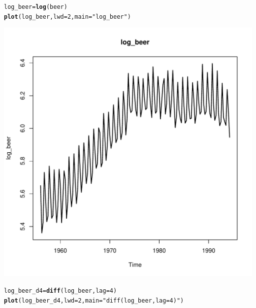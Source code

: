 \documentclass[10pt]{article}\usepackage[]{graphicx}\usepackage[]{color}
\makeatletter
\def\maxwidth{ %
  \ifdim\Gin@nat@width>\linewidth
    \linewidth
  \else
    \Gin@nat@width
  \fi
}
\newcommand{\hlnum}[1]{\textcolor[rgb]{0.686,0.059,0.569}{#1}}%
\newcommand{\hlstr}[1]{\textcolor[rgb]{0.192,0.494,0.8}{#1}}%
\newcommand{\hlstd}[1]{\textcolor[rgb]{0.345,0.345,0.345}{#1}}%
\newcommand{\hlkwb}[1]{\textcolor[rgb]{0.69,0.353,0.396}{#1}}%
\newcommand{\hlkwc}[1]{\textcolor[rgb]{0.333,0.667,0.333}{#1}}%
\newcommand{\hlkwd}[1]{\textcolor[rgb]{0.737,0.353,0.396}{\textbf{#1}}}%
\newenvironment{kframe}{%
 \def\at@end@of@kframe{}%
 \ifinner\ifhmode%
  \def\at@end@of@kframe{\end{minipage}}%
  \begin{minipage}{\columnwidth}%
 \fi\fi%
 \def\FrameCommand##1{\hskip\@totalleftmargin \hskip-\fboxsep
 \colorbox{shadecolor}{##1}\hskip-\fboxsep
     \hskip-\linewidth \hskip-\@totalleftmargin \hskip\columnwidth}%
 \MakeFramed {\advance\hsize-\width
   \@totalleftmargin\z@ \linewidth\hsize
   \@setminipage}}%
 {\par\unskip\endMakeFramed%
 \at@end@of@kframe}
\newenvironment{knitrout}{}{} %
\makeatother
\begin{document}
\begin{knitrout}
\color{fgcolor}\begin{kframe}
\begin{alltt}
\hlstd{log_beer} \hlkwb{=} \hlkwd{log}\hlstd{(beer)}
\hlkwd{plot}\hlstd{(log_beer,} \hlkwc{lwd}\hlstd{=}\hlnum{2}\hlstd{,} \hlkwc{main}\hlstd{=}\hlstr{"log_beer"}\hlstd{)}
\end{alltt}
\end{kframe}
\includegraphics[width=\maxwidth]{figure/unnamed-chunk-17-1} 
\begin{kframe}\begin{alltt}
\hlstd{log_beer_d4} \hlkwb{=} \hlkwd{diff}\hlstd{(log_beer,} \hlkwc{lag} \hlstd{=} \hlnum{4}\hlstd{)}
\hlkwd{plot}\hlstd{(log_beer_d4,}\hlkwc{lwd} \hlstd{=} \hlnum{2}\hlstd{,} \hlkwc{main} \hlstd{=} \hlstr{"diff(log_beer, lag = 4)"}\hlstd{)}
\end{alltt}
\end{kframe}

\end{knitrout}
\end{document}
